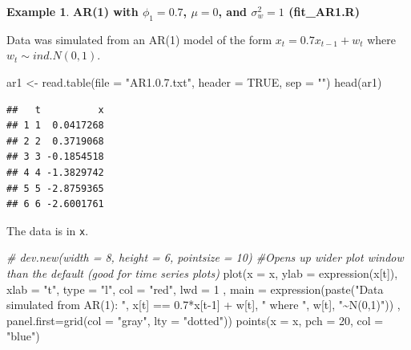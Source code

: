 \documentclass[
]{book}
\newenvironment{Shaded}{\begin{snugshade}}{\end{snugshade}}
\newcommand{\AttributeTok}[1]{\textcolor[rgb]{0.77,0.63,0.00}{#1}}
\newcommand{\CommentTok}[1]{\textcolor[rgb]{0.56,0.35,0.01}{\textit{#1}}}
\newcommand{\ConstantTok}[1]{\textcolor[rgb]{0.00,0.00,0.00}{#1}}
\newcommand{\DecValTok}[1]{\textcolor[rgb]{0.00,0.00,0.81}{#1}}
\newcommand{\FloatTok}[1]{\textcolor[rgb]{0.00,0.00,0.81}{#1}}
\newcommand{\FunctionTok}[1]{\textcolor[rgb]{0.00,0.00,0.00}{#1}}
\newcommand{\NormalTok}[1]{#1}
\newcommand{\OtherTok}[1]{\textcolor[rgb]{0.56,0.35,0.01}{#1}}
\newcommand{\SpecialCharTok}[1]{\textcolor[rgb]{0.00,0.00,0.00}{#1}}
\newcommand{\StringTok}[1]{\textcolor[rgb]{0.31,0.60,0.02}{#1}}
\theoremstyle{definition}
\theoremstyle{definition}
\newtheorem{example}{Example}[chapter]
\theoremstyle{definition}
\theoremstyle{definition}
\theoremstyle{remark}
\begin{document}
\begin{example}
\textbf{AR(1) with \(\phi_1=0.7\), \(\mu=0\), and \(\sigma_w^2=1\) (fit\_AR1.R)}

Data was simulated from an AR(1) model of the form \(x_t = 0.7x_{t-1} + w_t\) where \(w_t \sim ind.N(0,1).\)

\begin{Shaded}
\begin{Highlighting}[]
\NormalTok{ar1 }\OtherTok{\textless{}{-}} \FunctionTok{read.table}\NormalTok{(}\AttributeTok{file =} \StringTok{"AR1.0.7.txt"}\NormalTok{, }\AttributeTok{header =} \ConstantTok{TRUE}\NormalTok{, }\AttributeTok{sep =} \StringTok{""}\NormalTok{)}
\FunctionTok{head}\NormalTok{(ar1)}
\end{Highlighting}
\end{Shaded}

\begin{verbatim}
##   t          x
## 1 1  0.0417268
## 2 2  0.3719068
## 3 3 -0.1854518
## 4 4 -1.3829742
## 5 5 -2.8759365
## 6 6 -2.6001761
\end{verbatim}

\begin{Shaded}
\end{Shaded}

The data is in \texttt{x}.

\begin{Shaded}
\begin{Highlighting}[]
\CommentTok{\# dev.new(width = 8, height = 6, pointsize = 10)  \#Opens up wider plot window than the default (good for time series plots)}
\FunctionTok{plot}\NormalTok{(}\AttributeTok{x =}\NormalTok{ x, }\AttributeTok{ylab =} \FunctionTok{expression}\NormalTok{(x[t]), }\AttributeTok{xlab =} \StringTok{"t"}\NormalTok{, }\AttributeTok{type =} \StringTok{"l"}\NormalTok{, }\AttributeTok{col =} \StringTok{"red"}\NormalTok{, }\AttributeTok{lwd =} \DecValTok{1}\NormalTok{ , }
     \AttributeTok{main =} \FunctionTok{expression}\NormalTok{(}\FunctionTok{paste}\NormalTok{(}\StringTok{"Data simulated from AR(1): "}\NormalTok{, x[t] }\SpecialCharTok{==} \FloatTok{0.7}\SpecialCharTok{*}\NormalTok{x[t}\DecValTok{{-}1}\NormalTok{] }\SpecialCharTok{+}\NormalTok{ w[t], }\StringTok{" where "}\NormalTok{, w[t], }\StringTok{"\textasciitilde{}N(0,1)"}\NormalTok{)) , }
      \AttributeTok{panel.first=}\FunctionTok{grid}\NormalTok{(}\AttributeTok{col =} \StringTok{"gray"}\NormalTok{, }\AttributeTok{lty =} \StringTok{"dotted"}\NormalTok{))}
\FunctionTok{points}\NormalTok{(}\AttributeTok{x =}\NormalTok{ x, }\AttributeTok{pch =} \DecValTok{20}\NormalTok{, }\AttributeTok{col =} \StringTok{"blue"}\NormalTok{)}
\end{Highlighting}
\end{Shaded}


\end{example}
\end{document}
